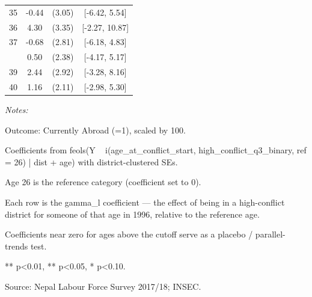 \begin{table}[!h]
\begin{threeparttable}
\begin{tabular}[t]{cccc}
35 & -0.44 & (3.05) & {}[-6.42, 5.54]\\
36 & 4.30 & (3.35) & {}[-2.27, 10.87]\\
37 & -0.68 & (2.81) & {}[-6.18, 4.83]\\
\addlinespace
38 & 0.50 & (2.38) & {}[-4.17, 5.17]\\
39 & 2.44 & (2.92) & {}[-3.28, 8.16]\\
40 & 1.16 & (2.11) & {}[-2.98, 5.30]\\
\bottomrule
\end{tabular}
\begin{tablenotes}
\item \textit{Notes:} 
\item Outcome: Currently Abroad (=1), scaled by 100.
\item Coefficients from feols(Y ~ i(age_at_conflict_start, high_conflict_q3_binary, ref = 26) | dist + age) with district-clustered SEs.
\item Age 26 is the reference category (coefficient set to 0).
\item Each row is the gamma_l coefficient — the effect of being in a high-conflict district for someone of that age in 1996, relative to the reference age.
\item Coefficients near zero for ages above the cutoff serve as a placebo / parallel-trends test.
\item *** p<0.01, ** p<0.05, * p<0.10.
\item Source: Nepal Labour Force Survey 2017/18; INSEC.
\end{tablenotes}
\end{threeparttable}
\end{table}
